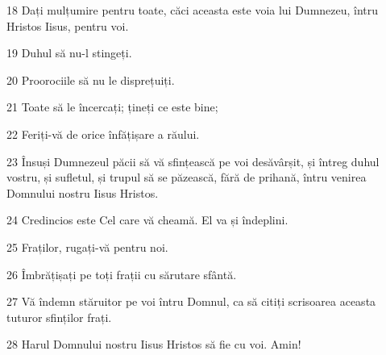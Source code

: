 \par 18 Dați mulțumire pentru toate, căci aceasta este voia lui Dumnezeu, întru Hristos Iisus, pentru voi.
\par 19 Duhul să nu-l stingeți.
\par 20 Proorociile să nu le disprețuiți.
\par 21 Toate să le încercați; țineți ce este bine;
\par 22 Feriți-vă de orice înfățișare a răului.
\par 23 Însuși Dumnezeul păcii să vă sfințească pe voi desăvârșit, și întreg duhul vostru, și sufletul, și trupul să se păzească, fără de prihană, întru venirea Domnului nostru Iisus Hristos.
\par 24 Credincios este Cel care vă cheamă. El va și îndeplini.
\par 25 Fraților, rugați-vă pentru noi.
\par 26 Îmbrățișați pe toți frații cu sărutare sfântă.
\par 27 Vă îndemn stăruitor pe voi întru Domnul, ca să citiți scrisoarea aceasta tuturor sfinților frați.
\par 28 Harul Domnului nostru Iisus Hristos să fie cu voi. Amin!


